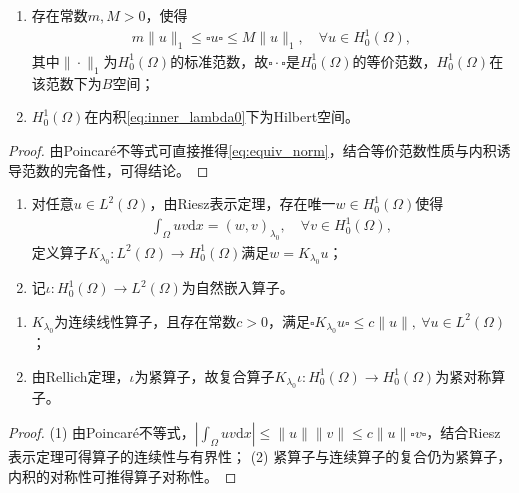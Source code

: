 \documentclass[../../main.tex]{subfiles}%
\begin{document}
\begin{proposition}
\begin{enumerate}[(1)]
\item 存在常数$m,M>0$，使得
\begin{align}
m\|u\|_1\leqslant\square u\square\leqslant M\|u\|_1,\quad \forall u\in H_0^1(\Omega),
\label{eq:equiv_norm}
\end{align}
其中$\|\cdot\|_1$为$H_0^1(\Omega)$的标准范数，故$\square\cdot\square$是$H_0^1(\Omega)$的等价范数，$H_0^1(\Omega)$在该范数下为$B$空间；
\item $H_0^1(\Omega)$在内积\eqref{eq:inner_lambda0}下为Hilbert空间。
\end{enumerate}
\end{proposition}
\begin{proof}

由Poincaré不等式可直接推得\eqref{eq:equiv_norm}，结合等价范数性质与内积诱导范数的完备性，可得结论。

\end{proof}

\begin{definition}
\begin{enumerate}[(1)]
\item 对任意$u\in L^2(\Omega)$，由Riesz表示定理，存在唯一$w\in H_0^1(\Omega)$使得
\begin{align}
\int_{\Omega}uv\mathrm{d}x=(w,v)_{\lambda_0},\quad \forall v\in H_0^1(\Omega),
\label{eq:riesz_rep}
\end{align}
定义算子$K_{\lambda_0}:L^2(\Omega)\to H_0^1(\Omega)$满足$w=K_{\lambda_0}u$；
\item 记$\iota:H_0^1(\Omega)\to L^2(\Omega)$为自然嵌入算子。
\end{enumerate}
\end{definition}

\begin{proposition}
\begin{enumerate}[(1)]
\item $K_{\lambda_0}$为连续线性算子，且存在常数$c>0$，满足$\square K_{\lambda_0}u\square\leqslant c\|u\|,\ \forall u\in L^2(\Omega)$；
\item 由Rellich定理，$\iota$为紧算子，故复合算子$K_{\lambda_0}\iota:H_0^1(\Omega)\to H_0^1(\Omega)$为紧对称算子。
\end{enumerate}
\end{proposition}
\begin{proof}

(1) 由Poincaré不等式，$\left|\int_{\Omega}uv\mathrm{d}x\right|\leqslant\|u\|\|v\|\leqslant c\|u\|\square v\square$，结合Riesz表示定理可得算子的连续性与有界性；
(2) 紧算子与连续算子的复合仍为紧算子，内积的对称性可推得算子对称性。

\end{proof}
\end{document}

